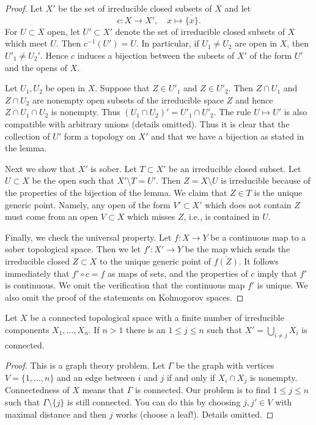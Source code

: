 \begin{proof}
Let $X'$ be the set of irreducible closed subsets of $X$ and let
$$
c : X \to X', \quad x \mapsto \overline{\{x\}}.
$$
For $U \subset X$ open, let $U' \subset X'$ denote the set
of irreducible closed subsets of $X$ which meet $U$.
Then $c^{-1}(U') = U$. In particular, if $U_1 \not = U_2$ are open in
$X$, then $U'_1 \not = U_2'$. Hence $c$ induces
a bijection between the subsets of $X'$ of the form $U'$ and the
opens of $X$.

\medskip\noindent
Let $U_1, U_2$ be open in $X$. Suppose that $Z \in U'_1$ and
$Z \in U'_2$. Then $Z \cap U_1$ and $Z \cap U_2$ are nonempty
open subsets of the irreducible space $Z$ and hence $Z \cap U_1 \cap U_2$
is nonempty. Thus $(U_1 \cap U_2)' = U'_1 \cap U'_2$.
The rule $U \mapsto U'$ is also compatible with arbitrary unions
(details omitted). Thus it is clear that the collection of
$U'$ form a topology on $X'$ and that we have a bijection as
stated in the lemma.

\medskip\noindent
Next we show that $X'$ is sober. Let $T \subset X'$ be an irreducible
closed subset. Let $U \subset X$ be the open such that $X' \setminus T = U'$.
Then $Z = X \setminus U$ is irreducible because of the properties
of the bijection of the lemma. We claim that $Z \in T$ is the unique generic
point. Namely, any open of the form $V' \subset X'$
which does not contain $Z$ must come from an open $V \subset X$
which misses $Z$, i.e., is contained in $U$.

\medskip\noindent
Finally, we check the universal property. Let $f : X \to Y$ be a continuous
map to a sober topological space. Then we let $f' : X' \to Y$ be the map
which sends the irreducible closed $Z \subset X$ to the unique generic
point of $\overline{f(Z)}$. It follows immediately that
$f' \circ c = f$ as maps of sets, and the properties of $c$ imply that
$f'$ is continuous. We omit the verification that the continuous
map $f'$ is unique. We also omit the proof of the statements on
Kolmogorov spaces.
\end{proof}

\begin{lemma}
\label{lemma-remove-irreducible-connected}
Let $X$ be a connected topological space with a finite number of
irreducible components $X_1, \ldots, X_n$. If $n > 1$ there is an
$1 \leq j \leq n$ such that $X' = \bigcup_{i \not = j} X_i$ is connected.
\end{lemma}

\begin{proof}
This is a graph theory problem. Let $\Gamma$ be the graph with vertices
$V = \{1, \ldots, n\}$ and an edge between $i$ and $j$ if and only if
$X_i \cap X_j$ is nonempty. Connectedness of $X$ means that $\Gamma$
is connected. Our problem is to find $1 \leq j \leq n$ such that
$\Gamma \setminus \{j\}$ is still connected. You can do this by choosing
$j, j' \in V$ with maximal distance and then $j$ works (choose a leaf!).
Details omitted.
\end{proof}


